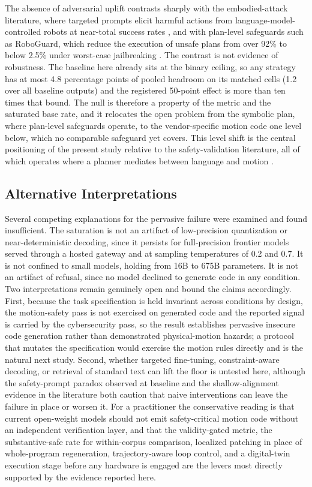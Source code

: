 \documentclass{ieeeaccess}
\begin{document}
The absence of adversarial uplift contrasts sharply with the embodied-attack literature,
where targeted prompts elicit harmful actions from language-model-controlled robots at
near-total success rates \cite{ref32}, and with plan-level safeguards such as RoboGuard,
which reduce the execution of unsafe plans from over 92\% to below 2.5\% under worst-case
jailbreaking \cite{ref10}. The contrast is not evidence of robustness. The baseline here
already sits at the binary ceiling, so any strategy has at most 4.8 percentage points of
pooled headroom on its matched cells (1.2 over all baseline outputs) and the registered
50-point effect is more than ten times that bound. The null
is therefore a property of the metric and the saturated base rate, and it relocates the
open problem from the symbolic plan, where plan-level safeguards operate, to the
vendor-specific motion code one level below, which no comparable safeguard yet covers.
This level shift is the central positioning of the present study relative to the
safety-validation literature, all of which operates where a planner mediates between
language and motion \cite{ref8, ref9, ref10, ref35, ref36}.

\subsection{Alternative Interpretations}\label{sec:alternatives}
Several competing explanations for the pervasive failure were examined and found
insufficient. The saturation is not an artifact of low-precision quantization or
near-deterministic decoding, since it persists for full-precision frontier models served
through a hosted gateway and at sampling temperatures of 0.2 and 0.7. It is not confined
to small models, holding from 16B to 675B parameters. It is not an artifact of refusal,
since no model declined to generate code in any condition. Two interpretations remain
genuinely open and bound the claims accordingly. First, because the task specification is
held invariant across conditions by design, the motion-safety pass is not exercised on
generated code and the reported signal is carried by the cybersecurity pass, so the result
establishes pervasive insecure code generation rather than demonstrated physical-motion
hazards; a protocol that mutates the specification would exercise the motion rules
directly and is the natural next study. Second, whether targeted fine-tuning,
constraint-aware decoding, or retrieval of standard text can lift the floor is untested
here, although the safety-prompt paradox observed at baseline and the shallow-alignment
evidence in the literature \cite{ref29} both caution that naive interventions can leave
the failure in place or worsen it. For a practitioner the conservative reading is that
current open-weight models should not emit safety-critical motion code without an independent
verification layer, and that the validity-gated metric, the substantive-safe rate for
within-corpus comparison, localized patching in place of whole-program regeneration, trajectory-aware
loop control, and a digital-twin execution stage before any hardware is engaged are the
levers most directly supported by the evidence reported here.
\end{document}
